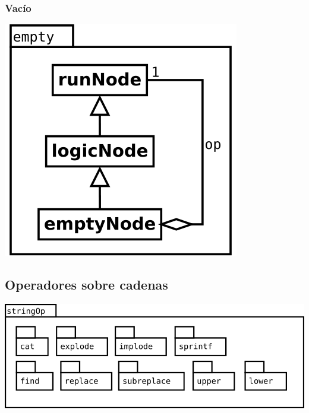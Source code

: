 \subsubsection {Vacío}
\begin{center}
\includegraphics[scale=0.4]{empty.png} \\
\end{center}


\pagebreak
\subsection {Operadores sobre cadenas}
\begin{center}
\includegraphics[scale=0.4]{stringOp-package.png} \\
\end{center}

